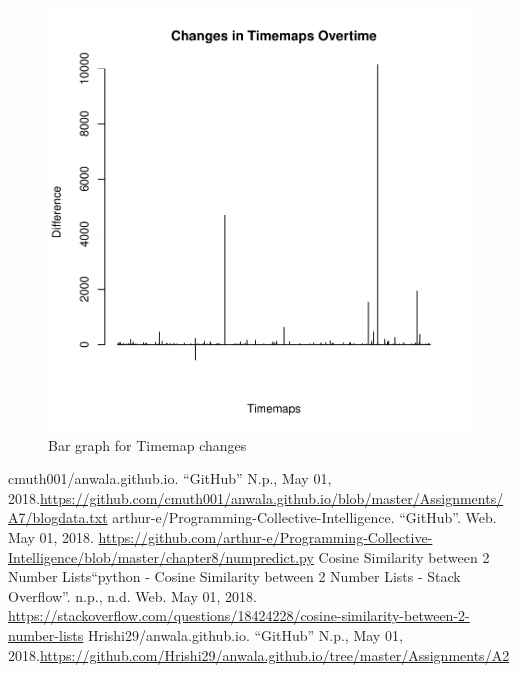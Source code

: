 \documentclass[letterpaper,11pt]{article}
\begin{document}
 \begin{figure}[h]
 \centering
 \includegraphics[scale=0.8]{timegraph.pdf}
 \caption{Bar graph for Timemap changes}
 \label{fig:q2split3}
 \end{figure}


\clearpage




\begin{thebibliography}{9}
cmuth001/anwala.github.io. ``GitHub''  N.p., May 01, 2018.\url{https://github.com/cmuth001/anwala.github.io/blob/master/Assignments/A7/blogdata.txt}
arthur-e/Programming-Collective-Intelligence. ``GitHub''. Web. May 01, 2018. \url{https://github.com/arthur-e/Programming-Collective-Intelligence/blob/master/chapter8/numpredict.py}
Cosine Similarity between 2 Number Lists``python - Cosine Similarity between 2 Number Lists - Stack Overflow''. n.p., n.d. Web. May 01, 2018. \url{https://stackoverflow.com/questions/18424228/cosine-similarity-between-2-number-lists}
Hrishi29/anwala.github.io. ``GitHub''  N.p., May 01, 2018.\url{https://github.com/Hrishi29/anwala.github.io/tree/master/Assignments/A2}

\end{thebibliography}
\end{document}
